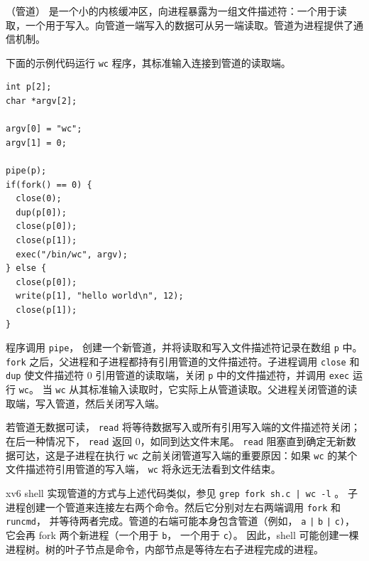 （管道）
是一个小的内核缓冲区，向进程暴露为一组文件描述符：一个用于读取，一个用于写入。向管道一端写入的数据可从另一端读取。管道为进程提供了通信机制。

下面的示例代码运行
\lstinline{wc}
程序，其标准输入连接到管道的读取端。
\begin{lstlisting}[]
int p[2];
char *argv[2];

argv[0] = "wc";
argv[1] = 0;

pipe(p);
if(fork() == 0) {
  close(0);
  dup(p[0]);
  close(p[0]);
  close(p[1]);
  exec("/bin/wc", argv);
} else {
  close(p[0]);
  write(p[1], "hello world\n", 12);
  close(p[1]);
}
\end{lstlisting}
程序调用
\lstinline{pipe}，
创建一个新管道，并将读取和写入文件描述符记录在数组
\lstinline{p}
中。
\lstinline{fork}
之后，父进程和子进程都持有引用管道的文件描述符。子进程调用 \lstinline{close} 和 \lstinline{dup} 使文件描述符 0 引用管道的读取端，关闭
\lstinline{p}
中的文件描述符，并调用 \lstinline{exec} 运行
\lstinline{wc}。
当
\lstinline{wc}
从其标准输入读取时，它实际上从管道读取。父进程关闭管道的读取端，写入管道，然后关闭写入端。

若管道无数据可读，
\lstinline{read}
将等待数据写入或所有引用写入端的文件描述符关闭；在后一种情况下，
\lstinline{read}
返回 0，如同到达文件末尾。
\lstinline{read}
阻塞直到确定无新数据可达，这是子进程在执行
\lstinline{wc}
之前关闭管道写入端的重要原因：如果
\lstinline{wc}
的某个文件描述符引用管道的写入端，
\lstinline{wc}
将永远无法看到文件结束。

xv6 shell 实现管道的方式与上述代码类似，参见
\lstinline{grep fork sh.c | wc -l}
。
子进程创建一个管道来连接左右两个命令。然后它分别对左右两端调用
\lstinline{fork}
和
\lstinline{runcmd}，
并等待两者完成。管道的右端可能本身包含管道（例如，
\lstinline{a}
\lstinline{|}
\lstinline{b}
\lstinline{|}
\lstinline{c)}，
它会再 fork 两个新进程（一个用于
\lstinline{b}，
一个用于
\lstinline{c}）。
因此，shell 可能创建一棵进程树。树的叶子节点是命令，内部节点是等待左右子进程完成的进程。

